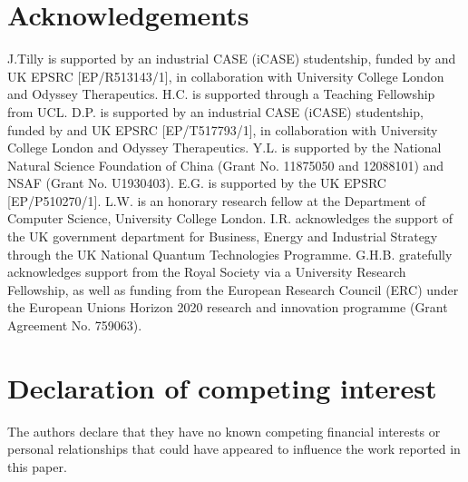 \section*{Acknowledgements} \label{sec:acknowledgements}

J.Tilly is supported by an industrial CASE (iCASE) studentship, funded by and UK EPSRC [EP/R513143/1], in collaboration with University College London and Odyssey Therapeutics.
H.C. is supported through a Teaching Fellowship from UCL.
D.P.  is supported by an industrial CASE (iCASE) studentship, funded by and UK EPSRC [EP/T517793/1], in collaboration with University College London and Odyssey Therapeutics.
Y.L. is supported by the National Natural Science Foundation of China (Grant No. 11875050 and 12088101) and NSAF (Grant No. U1930403).
E.G. is supported by the UK EPSRC [EP/P510270/1].  
L.W. is an honorary research fellow at the Department of Computer Science, University College London.
I.R. acknowledges the support of the UK government department for Business, Energy and Industrial Strategy through the UK National Quantum Technologies Programme.
G.H.B. gratefully acknowledges support from the Royal Society via a University Research Fellowship, as well as funding from the European Research Council (ERC) under the European Union\textquotesingle s Horizon 2020 research and innovation programme (Grant Agreement No. 759063).

\section*{Declaration of competing interest}

The authors declare that they have no known competing financial interests or personal relationships that could have appeared to influence the work reported in this paper.
